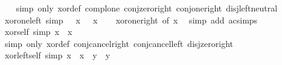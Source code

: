 \begin{isabellebody}
%
\isadelimproof
\ \ %
\endisadelimproof
%
\isatagproof
{}\isamarkupfalse%
\ {\isacharparenleft}{\kern0pt}simp\ only{\isacharcolon}{\kern0pt}\ xor{\isacharunderscore}{\kern0pt}def\ compl{\isacharunderscore}{\kern0pt}one\ conj{\isacharunderscore}{\kern0pt}zero{\isacharunderscore}{\kern0pt}right\ conj{\isacharunderscore}{\kern0pt}one{\isacharunderscore}{\kern0pt}right\ disj{\isachardot}{\kern0pt}left{\isacharunderscore}{\kern0pt}neutral{\isacharparenright}{\kern0pt}%
\endisatagproof
{\isafoldproof}%
%
\isadelimproof
\isanewline
%
\endisadelimproof
\isanewline
{}\isamarkupfalse%
\ xor{\isacharunderscore}{\kern0pt}one{\isacharunderscore}{\kern0pt}left\ {\isacharbrackleft}{\kern0pt}simp{\isacharbrackright}{\kern0pt}{\isacharcolon}{\kern0pt}\ {\isachardoublequoteopen}\ \isactrlbold {\isasymominus}\ x\ {\isacharequal}{\kern0pt}\ \isactrlbold {\isacharminus}{\kern0pt}\ x{\isachardoublequoteclose}\isanewline
%
\isadelimproof
\ \ %
\endisadelimproof
%
\isatagproof
{}\isamarkupfalse%
\ xor{\isacharunderscore}{\kern0pt}one{\isacharunderscore}{\kern0pt}right\ {\isacharbrackleft}{\kern0pt}of\ x{\isacharbrackright}{\kern0pt}\ \isamarkupfalse%
\ {\isacharparenleft}{\kern0pt}simp\ add{\isacharcolon}{\kern0pt}\ ac{\isacharunderscore}{\kern0pt}simps{\isacharparenright}{\kern0pt}%
\endisatagproof
{\isafoldproof}%
%
\isadelimproof
\isanewline
%
\endisadelimproof
\isanewline
{}\isamarkupfalse%
\ xor{\isacharunderscore}{\kern0pt}self\ {\isacharbrackleft}{\kern0pt}simp{\isacharbrackright}{\kern0pt}{\isacharcolon}{\kern0pt}\ {\isachardoublequoteopen}x\ \isactrlbold {\isasymominus}\ x\ {\isacharequal}{\kern0pt}\ \isanewline
%
\isadelimproof
\ \ %
\endisadelimproof
%
\isatagproof
{}\isamarkupfalse%
\ {\isacharparenleft}{\kern0pt}simp\ only{\isacharcolon}{\kern0pt}\ xor{\isacharunderscore}{\kern0pt}def\ conj{\isacharunderscore}{\kern0pt}cancel{\isacharunderscore}{\kern0pt}right\ conj{\isacharunderscore}{\kern0pt}cancel{\isacharunderscore}{\kern0pt}left\ disj{\isacharunderscore}{\kern0pt}zero{\isacharunderscore}{\kern0pt}right{\isacharparenright}{\kern0pt}%
\endisatagproof
{\isafoldproof}%
%
\isadelimproof
\isanewline
%
\endisadelimproof
\isanewline
{}\isamarkupfalse%
\ xor{\isacharunderscore}{\kern0pt}left{\isacharunderscore}{\kern0pt}self\ {\isacharbrackleft}{\kern0pt}simp{\isacharbrackright}{\kern0pt}{\isacharcolon}{\kern0pt}\ {\isachardoublequoteopen}x\ \isactrlbold {\isasymominus}\ {\isacharparenleft}{\kern0pt}x\ \isactrlbold {\isasymominus}\ y{\isacharparenright}{\kern0pt}\ {\isacharequal}{\kern0pt}\ y{\isachardoublequoteclose}\isanewline

\end{isabellebody}
